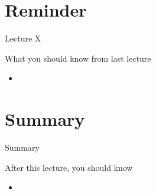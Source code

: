 \documentclass[12pt,t]{beamer}
\title{\coursename}
\subtitle{Lecture 1: Introduction and Getting started}
\date {
 \tiny \url{\courseurl}
\vspace{2cm}
\doclicenseThis  
  
}
\begin{document}
 {
    \frame {
        \titlepage
    }
}

\frame{

\tableofcontents

}


\section{Reminder}
\begin{frame}{Lecture X}
\begin{block}{What you should know from last lecture}
\begin{itemize}
\item 
\end{itemize}
\end{block}
\end{frame}

\section{Summary}
\begin{frame}{Summary}
\begin{block}{After this lecture, you should know}
\begin{itemize}
\item 
\end{itemize}
\end{block}
\end{frame}
\end{document}
